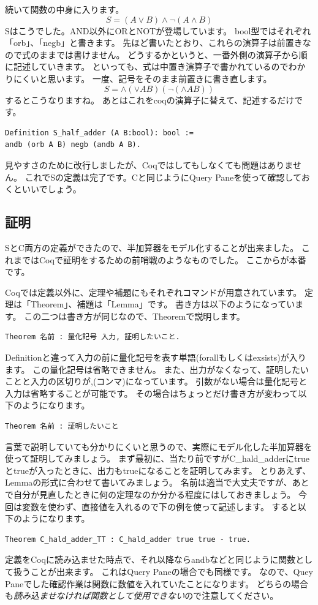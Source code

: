 \documentclass{jsbook}
\begin{document}
続いて関数の中身に入ります。
$$S=(A \vee B) \wedge \lnot (A \wedge B)$$
Sはこうでした。AND以外にORとNOTが登場しています。
bool型ではそれぞれ「orb」、「negb」と書きます。
先ほど書いたとおり、これらの演算子は前置きなので式のままでは書けません。
どうするかというと、一番外側の演算子から順に記述していきます。
といっても、式は中置き演算子で書かれているのでわかりにくいと思います。
一度、記号をそのまま前置きに書き直します。
$$S= \wedge (\vee  A B) (\lnot (\wedge A B))$$
するとこうなりますね。
あとはこれをcoqの演算子に替えて、記述するだけです。
\begin{verbatim}
Definition S_half_adder (A B:bool): bool :=
andb (orb A B) negb (andb A B).
\end{verbatim}
見やすさのために改行しましたが、Coqではしてもしなくても問題はありません。
これでSの定義は完了です。Cと同じようにQuery Paneを使って確認しておくといいでしょう。

\subsection*{証明}
SとC両方の定義ができたので、半加算器をモデル化することが出来ました。
これまではCoqで証明をするための前哨戦のようなものでした。
ここからが本番です。

Coqでは定義以外に、定理や補題にもそれぞれコマンドが用意されています。
定理は「Theorem」、補題は「Lemma」です。
書き方は以下のようになっています。
この二つは書き方が同じなので、Theoremで説明します。
\begin{verbatim}
Theorem 名前 : 量化記号 入力, 証明したいこと.
\end{verbatim}
Definitionと違って入力の前に量化記号を表す単語(forallもしくはexsists)が入ります。
この量化記号は省略できません。
また、出力がなくなって、証明したいことと入力の区切りが,(コンマ)になっています。
引数がない場合は量化記号と入力は省略することが可能です。
その場合はちょっとだけ書き方が変わって以下のようになります。
\begin{verbatim}
Theorem 名前 : 証明したいこと
\end{verbatim}

言葉で説明していても分かりにくいと思うので、実際にモデル化した半加算器を使って証明してみましょう。
まず最初に、当たり前ですがC\_hald\_adderにtrueとtrueが入ったときに、出力もtrueになることを証明してみます。
とりあえず、Lemmaの形式に合わせて書いてみましょう。
名前は適当で大丈夫ですが、あとで自分が見直したときに何の定理なのか分かる程度にはしておきましょう。
今回は変数を使わず、直接値を入れるので下の例を使って記述します。
すると以下のようになります。
\begin{verbatim}
Theorem C_hald_adder_TT : C_hald_adder true true - true.
\end{verbatim}
定義をCoqに読み込ませた時点で、それ以降ならandbなどと同じように関数として扱うことが出来ます。
これはQuery Paneの場合でも同様です。
なので、Quey Paneでした確認作業は関数に数値を入れていたことになります。
どちらの場合も\emph{読み込ませなければ関数として使用できない}ので注意してください。
\end{document}
